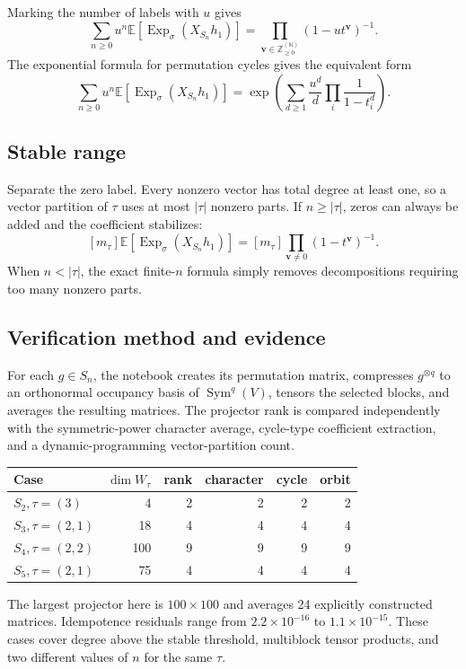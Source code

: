\documentclass[10pt]{article}
\newcommand{\Sym}{\operatorname{Sym}}
\newcommand{\ExpS}{\operatorname{Exp}_{\sigma}}
\newcommand{\smg}[1]{\mathbb E\!\left[\ExpS\!\left(X_{#1}h_1\right)\right]}
\begin{document}
Marking the number of labels with $u$ gives
\[
 \boxed{\sum_{n\ge0}u^n\smg{S_n}
 =\prod_{\mathbf v\in\mathbb Z_{\ge0}^{(\mathbb N)}}(1-ut^{\mathbf v})^{-1}.}
\]
The exponential formula for permutation cycles gives the equivalent form
\[
 \sum_{n\ge0}u^n\smg{S_n}
 =\exp\left(\sum_{d\ge1}\frac{u^d}{d}
 \prod_i\frac1{1-t_i^d}\right).
\]

\subsection{Stable range}
Separate the zero label.  Every nonzero vector has total degree at least one,
so a vector partition of $\tau$ uses at most $|\tau|$ nonzero parts.  If
$n\ge|\tau|$, zeros can always be added and the coefficient stabilizes:
\[
 [m_\tau]\smg{S_n}=[m_\tau]\prod_{\mathbf v\ne0}(1-t^{\mathbf v})^{-1}.
\]
When $n<|\tau|$, the exact finite-$n$ formula simply removes decompositions
requiring too many nonzero parts.

\subsection{Verification method and evidence}
For each $g\in S_n$, the notebook creates its permutation matrix, compresses
$g^{\otimes q}$ to an orthonormal occupancy basis of $\Sym^q(V)$, tensors the
selected blocks, and averages the resulting matrices.  The projector rank is
compared independently with the symmetric-power character average, cycle-type
coefficient extraction, and a dynamic-programming vector-partition count.

\begin{center}
\begin{tabular}{@{}lrrrrr@{}}
\toprule
Case & $\dim W_\tau$ & rank & character & cycle & orbit\\
\midrule
$S_2,\tau=(3)$ & 4 & 2 & 2 & 2 & 2\\
$S_3,\tau=(2,1)$ & 18 & 4 & 4 & 4 & 4\\
$S_4,\tau=(2,2)$ & 100 & 9 & 9 & 9 & 9\\
$S_5,\tau=(2,1)$ & 75 & 4 & 4 & 4 & 4\\
\bottomrule
\end{tabular}
\end{center}
The largest projector here is $100\times100$ and averages 24 explicitly
constructed matrices.  Idempotence residuals range from
$2.2\times10^{-16}$ to $1.1\times10^{-15}$.  These cases cover degree above
the stable threshold, multiblock tensor products, and two different values of
$n$ for the same $\tau$.
\end{document}
